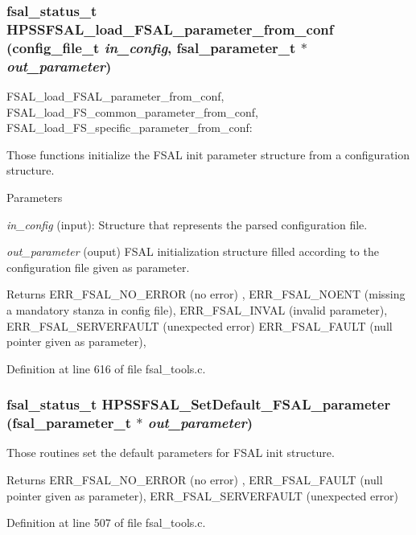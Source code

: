 \subsubsection[{HPSSFSAL\_\-load\_\-FSAL\_\-parameter\_\-from\_\-conf}]{\setlength{\rightskip}{0pt plus 5cm}fsal\_\-status\_\-t HPSSFSAL\_\-load\_\-FSAL\_\-parameter\_\-from\_\-conf (config\_\-file\_\-t {\em in\_\-config}, \/  fsal\_\-parameter\_\-t $\ast$ {\em out\_\-parameter})}\label{fsal__tools_8c_acbfbfa7ebfd1a1925ba80f133aef995f}
FSAL\_\-load\_\-FSAL\_\-parameter\_\-from\_\-conf, FSAL\_\-load\_\-FS\_\-common\_\-parameter\_\-from\_\-conf, FSAL\_\-load\_\-FS\_\-specific\_\-parameter\_\-from\_\-conf:

Those functions initialize the FSAL init parameter structure from a configuration structure.


\begin{DoxyParams}{Parameters}
\item[{\em in\_\-config}](input): Structure that represents the parsed configuration file. \item[{\em out\_\-parameter}](ouput) FSAL initialization structure filled according to the configuration file given as parameter.\end{DoxyParams}
\begin{DoxyReturn}{Returns}
ERR\_\-FSAL\_\-NO\_\-ERROR (no error) , ERR\_\-FSAL\_\-NOENT (missing a mandatory stanza in config file), ERR\_\-FSAL\_\-INVAL (invalid parameter), ERR\_\-FSAL\_\-SERVERFAULT (unexpected error) ERR\_\-FSAL\_\-FAULT (null pointer given as parameter), 
\end{DoxyReturn}


Definition at line 616 of file fsal\_\-tools.c.
\subsubsection[{HPSSFSAL\_\-SetDefault\_\-FSAL\_\-parameter}]{\setlength{\rightskip}{0pt plus 5cm}fsal\_\-status\_\-t HPSSFSAL\_\-SetDefault\_\-FSAL\_\-parameter (fsal\_\-parameter\_\-t $\ast$ {\em out\_\-parameter})}\label{fsal__tools_8c_a6ff6a1e88484ad34aa9047e4cf2e7aac}
Those routines set the default parameters for FSAL init structure. \begin{DoxyReturn}{Returns}
ERR\_\-FSAL\_\-NO\_\-ERROR (no error) , ERR\_\-FSAL\_\-FAULT (null pointer given as parameter), ERR\_\-FSAL\_\-SERVERFAULT (unexpected error) 
\end{DoxyReturn}


Definition at line 507 of file fsal\_\-tools.c.